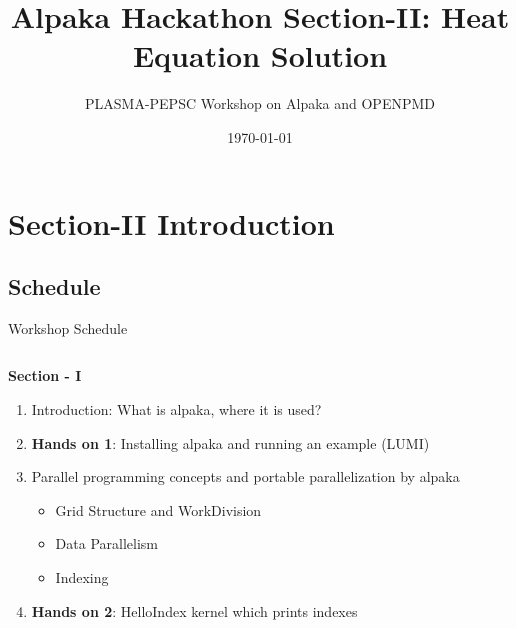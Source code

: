 \documentclass[9pt]{beamer}
\title{Alpaka Hackathon Section-II: Heat Equation Solution} %
\author{PLASMA-PEPSC Workshop on Alpaka and OPENPMD} %
\institute[HZDR] %
{
\\ %
\medskip
\textit{} %
}
\date{\today} %
\begin{document}
\begin{frame}
\titlepage %
\end{frame}
\section{Section-II Introduction}
\subsection{Schedule}
\begin{frame}[t]{Workshop Schedule} %

\begin{columns}[T] %
\vspace{-1.3cm}
\hspace*{-0.6cm} %
\begin{column}{0.44\textwidth}
\textbf{\small Section - I}

\begin{enumerate}
\color{gray}
    \item \small Introduction: What is alpaka, where it is used?
    \item \small \textbf{Hands on 1}: Installing alpaka and running an example (LUMI)
    \item \small Parallel programming concepts and portable parallelization by alpaka
    \begin{itemize}
    \color{gray}
        \item \scriptsize Grid Structure and WorkDivision
        \item \scriptsize Data Parallelism
        \item \scriptsize Indexing
    \end{itemize}
    \item \small \textbf{Hands on 2}: HelloIndex kernel which prints indexes
\end{enumerate}
\end{column}


\end{columns}
\end{frame}
\end{document}
